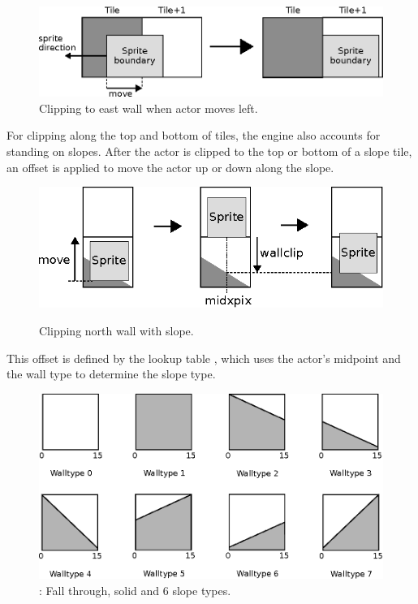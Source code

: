 \documentclass[book.tex]{subfiles}
\begin{document}
\begin{figure}[H]
  \centering
  \includegraphics[width=\textwidth]{imgs/drawings/clipping_east.eps}
  \caption{Clipping to east wall when actor moves left.}
  \label{fig:clipping_east}  
\end{figure}

\par
\begin{minipage}{\textwidth}
  
\end{minipage}
\label{wallclip_array}
\par
For clipping along the top and bottom of tiles, the engine also accounts for standing on slopes. After the actor is clipped to the top or bottom of a slope tile, an offset is applied to move the actor up or down along the slope. \\

\begin{figure}[H]
  \centering
  \includegraphics[width=\textwidth]{imgs/drawings/clipping_north.eps}
  \label{fig:clipping_north}
  \caption{Clipping north wall with slope.}
\end{figure}

This offset is defined by the lookup table , which uses the actor's midpoint and the wall type to determine the slope type.

\par
\begin{figure}[H]
  \centering
  \includegraphics[width=\textwidth]{imgs/drawings/walltype.eps}
  \caption{: Fall through, solid and 6 slope types.}
  \label{fig:walltype}
\end{figure}
\end{document}
